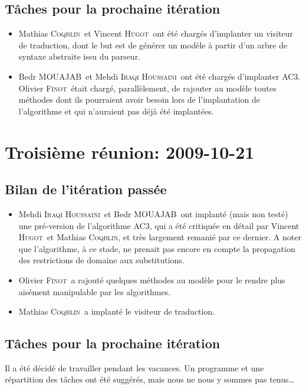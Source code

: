 \documentclass[a4paper,12pt]{article}
\def\familyname{\textsc}
\def\firstname#1{#1}
\def\groupmember#1#2{\firstname{#1} \familyname{#2}}
\def\mmat{\groupmember{Mathias}{Coqblin}}
\def\moli{\groupmember{Olivier}{Finot}}
\def\mvin{\groupmember{Vincent}{Hugot}}
\def\mmed{\groupmember{Mehdi}{Iraqi Houssaini}}
\def\mbed{\groupmember{Bedr}{MOUAJAB}}
\begin{document}
\subsection{Tâches pour la prochaine itération}

\begin{itemize}
 \item \mmat\ et \mvin\ ont été chargés d'implanter un visiteur
de traduction, dont le but est de générer un modèle à partir 
d'un arbre de syntaxe abstraite issu du parseur.

\item \mbed\ et \mmed\ ont été chargés d'implanter AC3. \moli\
était chargé, parallèlement, de rajouter au modèle
toutes méthodes dont ils pourraient avoir besoin lors de
l'implantation de l'algorithme et qui n'auraient pas
déjà été implantées.

\end{itemize}



\section{Troisième réunion: 2009-10-21}

\subsection{Bilan de l'itération passée}

\begin{itemize}
 \item \mmed\ et \mbed\ ont implanté (mais non testé) une pré-version de 
 l'algorithme AC3, qui a été critiquée en détail par \mvin\ et \mmat, et très
 largement remanié par ce dernier.
 A noter que l'algorithme, à ce stade, ne prenait pas encore en compte la
 propagation des restrictions de domaine aux substitutions.
\item \moli\ a rajouté quelques méthodes au modèle pour le rendre plus aisément
manipulable par les algorithmes.
\item \mmat\ a implanté le visiteur de traduction.
\end{itemize}


\subsection{Tâches pour la prochaine itération}

Il a été décidé de travailler pendant les vacances. Un programme
et une répartition des tâches ont été suggérés, mais nous ne nous y sommes pas 
tenus\dots
\end{document}
